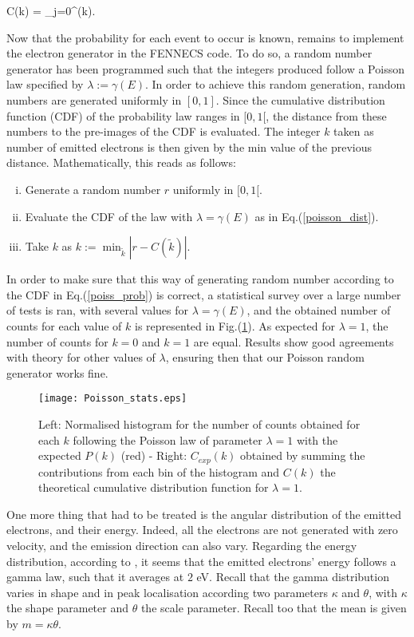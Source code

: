 \beq
C(k) = \sum_{j=0}^{\lfloor(k)\rfloor}. \label{poisson_dist}
\eeq


\noindent Now that the probability for each event to occur is known, remains to implement the electron generator in the FENNECS code. To do so, a random number generator has been programmed such that the integers produced follow a Poisson law specified by $\lambda := \gamma(E)$. In order to achieve this random generation, random numbers are generated uniformly in $[0,1]$. Since the cumulative distribution function (CDF) of the probability law ranges in $[0,1[$, the distance from these numbers to the pre-images of the CDF is evaluated. The integer $k$ taken as number of emitted electrons is then given by the min value of the previous distance. Mathematically, this reads as follows: 


\begin{enumerate}[i)]
\item{Generate a random number $r$ uniformly  in $[0,1[. $}
\item{Evaluate the CDF of the law with $\lambda = \gamma(E)$ as in Eq.(\ref{poisson_dist}).}
\item{Take $k$ as $k := \min_{\tilde{k}} |r-C(\tilde{k})|$}.
\end{enumerate}


\noindent In order to make sure that this way of generating random number according to the CDF in Eq.(\ref{poiss_prob}) is correct, a statistical survey over a large number of tests is ran, with several values for $\lambda = \gamma(E)$, and the obtained number of counts for each value of $k$ is represented in Fig.(\ref{Poisson_stat}). As expected for $\lambda=1$, the number of counts for $k=0$ and $k=1$ are equal. Results show good agreements with theory for other values of $\lambda$, ensuring then that our Poisson random generator works fine. \\

\begin{figure}[h!]
\centering
	\texttt{[image: Poisson\_stats.eps]}
	\caption{\label{Poisson_stat} Left: Normalised histogram for the number of counts obtained for each $k$ following the Poisson law of parameter $\lambda = 1$ with the expected $P(k)$ (red) - Right: $C_{exp}(k)$ obtained by summing the contributions from each bin of the histogram and $C(k)$ the theoretical cumulative distribution function for $\lambda = 1$. }
\end{figure}  

One more thing that had to be treated is the angular distribution of the emitted electrons, and their energy. Indeed, all the electrons are not generated with zero velocity, and the emission direction can also vary.  Regarding the energy distribution, according to \cite{HasselII, Pagonakis}, it seems that the emitted electrons' energy follows a gamma law, such that it averages at $2$ eV. Recall that the gamma distribution varies in shape and in peak localisation according two parameters $\kappa$ and $\theta$, with $\kappa$ the shape parameter and $\theta$ the scale parameter. Recall too that the mean is given by $m=\kappa \theta$. \\

